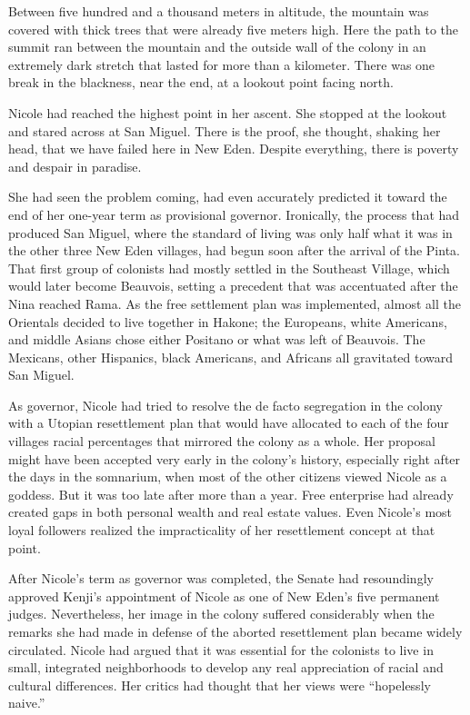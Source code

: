 \documentclass[]{article}
\begin{document}
{Between five hundred and a thousand meters in altitude, the mountain was covered with thick trees that were already five meters high.  Here the path to the summit ran between the mountain and the outside wall of the colony in an extremely dark stretch that lasted for more than a kilometer.  There was one break in the blackness, near the end, at a lookout point facing north.

Nicole had reached the highest point in her ascent.  She stopped at the lookout and stared across at San Miguel.  There is the proof, she thought, shaking her head, that we have failed here in New Eden.  Despite everything, there is poverty and despair in paradise.

She had seen the problem coming, had even accurately predicted it toward the end of her one-year term as provisional governor.  Ironically, the process that had produced San Miguel, where the standard of living was only half what it was in the other three New Eden villages, had begun soon after the arrival of the Pinta.  That first group of colonists had mostly settled in the Southeast Village, which would later become Beauvois, setting a precedent that was accentuated after the Nina reached Rama.  As the free settlement plan was implemented, almost all the Orientals decided to live together in Hakone; the Europeans, white Americans, and middle Asians chose either Positano or what was left of Beauvois.  The Mexicans, other Hispanics, black Americans, and Africans all gravitated toward San Miguel.

As governor, Nicole had tried to resolve the de facto segregation in the colony with a Utopian resettlement plan that would have allocated to each of the four villages racial percentages that mirrored the colony as a whole.  Her proposal might have been accepted very early in the colony’s history, especially right after the days in the somnarium, when most of the other citizens viewed Nicole as a goddess.  But it was too late after more than a year.  Free enterprise had already created gaps in both personal wealth and real estate values.  Even Nicole’s most loyal followers realized the impracticality of her resettlement concept at that point.

After Nicole’s term as governor was completed, the Senate had resoundingly approved Kenji’s appointment of Nicole as one of New Eden’s five permanent judges.  Nevertheless, her image in the colony suffered considerably when the remarks she had made in defense of the aborted resettlement plan became widely circulated.  Nicole had argued that it was essential for the colonists to live in small, integrated neighborhoods to develop any real appreciation of racial and cultural differences.  Her critics had thought that her views were “hopelessly naive.”

}
\end{document}

